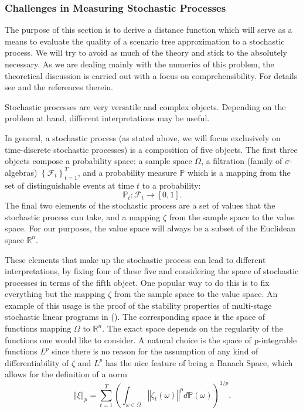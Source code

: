 \documentclass[a4paper, 12pt] {article}
\begin{document}
\subsubsection{Challenges in Measuring Stochastic Processes}
The purpose of this section is to derive a distance function which will serve as a means to evaluate the quality of a scenario tree approximation to a stochastic process. We will try to avoid as much of the theory and stick to the absolutely necessary. As we are dealing mainly with the numerics of this problem, the theoretical discussion is carried out with a focus on comprehensibility. For details see \cite{Heitsch2010} and the references therein.

Stochastic processes are very versatile and complex objects. Depending on the problem at hand, different interpretations may be useful. 

In general, a stochastic process (as stated above, we will focus exclusively on time-discrete stochastic processes) is a composition of five objects. The first three objects compose a probability space: a sample space $\Omega$, a filtration (family of $\sigma$-algebras) $\left\{\mathcal{F}_t\right\}_{t=1}^T$, and a probability measure $\mathbb{P}$ which is a mapping from the set of distinguishable events at time $t$ to a probability:
\begin{equation}
  \label{eq:prob-measure-definition}
  \mathbb{P}_t : \mathcal{F}_t \rightarrow \left[0,1\right]. 
\end{equation}
The final two elements of the stochastic process are a set of values that the stochastic process can take, and a mapping $\zeta$ from the sample space to the value space. For our purposes, the value space will always be a subset of the Euclidean space $\mathbb{R}^n$.

These elements that make up the stochastic process can lead to different interpretations, by fixing four of these five and considering the space of stochastic processes in terms of the fifth object. One popular way to do this is to fix everything but the mapping $\zeta$ from the sample space to the value space. An example of this usage is the proof of the stability properties of multi-stage stochastic linear programs in (\cite{Heitsch2010}). The corresponding space is the space of functions mapping $\Omega$ to $\mathbb{R}^n$. The exact space depends on the regularity of the functions one would like to consider. A natural choice is the space of p-integrable functions $L^p$ since there is no reason for the assumption of any kind of differentiability of $\zeta$ and $L^p$ has the nice feature of being a Banach Space, which allows for the definition of a norm
\begin{equation}
  \label{eq:Lp-norm}
  \left\Vert\xi\right\Vert_p = \sum_{t=1}^T\left(\int_{\omega\in \Omega}\left\Vert\zeta_t(\omega)\right\Vert^p d\mathbb{P}(\omega)\right)^{1/p}.
\end{equation}
\end{document}
